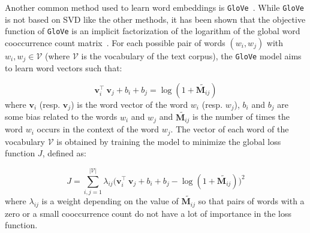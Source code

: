     Another common method used to learn word embeddings is
    \texttt{GloVe}~\citep{pennington2014glove}. While \texttt{GloVe} is not
    based on SVD like the other methods, it has been shown that the objective
    function of \texttt{GloVe} is an implicit factorization of the logarithm of
    the global word cooccurrence count matrix~\citep{levy2015improving}. For
    each possible pair of words $(w_i, w_j)$ with $w_i, w_j \in \mathcal{V}$
    (where $\mathcal{V}$ is the vocabulary of the text corpus), the
    \texttt{GloVe} model aims to learn word vectors such that:

    \begin{equation}
      \mathbf{v}_i^\top ~\mathbf{v}_j + b_i + b_j =
        \log(1 + \widetilde{\mathbf{M}_{ij}})
    \end{equation}
    where $\mathbf{v}_i$ (resp. $\mathbf{v}_j$) is the word vector of the word
    $w_i$ (resp. $w_j$), $b_i$ and $b_j$ are some bias related to the words
    $w_i$ and $w_j$ and $\widetilde{\mathbf{M}_{ij}}$ is the number of times the
    word $w_i$ occurs in the context of the word $w_j$. The vector of each word
    of the vocabulary $\mathcal{V}$ is obtained by training the model to
    minimize the global loss function $J$, defined as:

    \begin{equation}
      J = \sum_{i, j=1}^{|\mathcal{V}|}
        \lambda_{ij}
        \big(\mathbf{v}_i^\top ~\mathbf{v}_j + b_i + b_j -
             \log(1 + \widetilde{\mathbf{M}_{ij}})
        \big)^2
    \end{equation}
    where $\lambda_{ij}$ is a weight depending on the value of
    $\widetilde{\mathbf{M}_{ij}}$ so that pairs of words with a zero or a small
    cooccurrence count do not have a lot of importance in the loss function.
    \pagebreak


